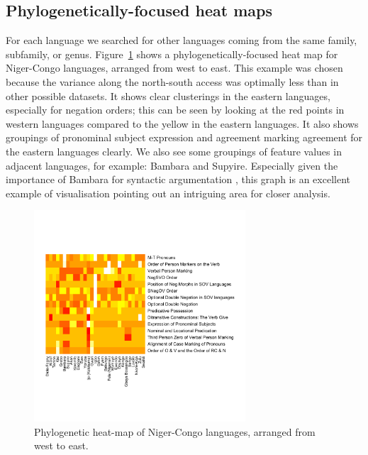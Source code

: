 \documentclass[11pt]{article}
\begin{document}
\subsection{Phylogenetically-focused heat maps}

For each language we searched for other languages coming from the same family, subfamily, or genus. Figure~\ref{fig:heat2} shows a phylogenetically-focused heat map for Niger-Congo languages, arranged from west to east. This example was chosen because the variance along the north-south access was optimally less than in other possible datasets. %
It shows clear clusterings in the eastern languages, especially for negation orders; this can be seen by looking at the red points in western languages compared to the yellow in the eastern languages. It also shows groupings of pronominal subject expression and agreement marking agreement for the eastern languages clearly. We also see some groupings of feature values in adjacent languages, for example: Bambara and Supyire. Especially given the importance of Bambara for syntactic argumentation \cite{culy}, this graph is an excellent example of visualisation pointing out an intriguing area for closer analysis.


\begin{figure}[ht!]
\includegraphics[width=3.1in]
{graph3nigercongo.pdf} 
\caption{Phylogenetic heat-map of Niger-Congo languages, arranged from west to east.} 
\label{fig:heat2} 
\end{figure}
\end{document}
